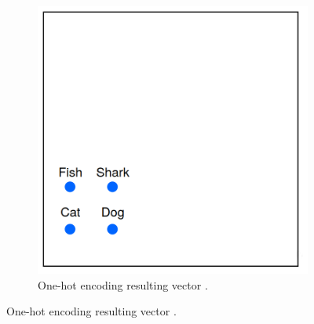         \begin{figure}[H]
            \centering
            \captionsetup{justification=centering}
          
            \begin{subfigure}{0.32\textwidth}
            \includegraphics[width=\textwidth]{Sections/3StateOfTheArt/3_images/one_hot_ex.png} 
            \caption[One-hot encoding resulting vector.]{One-hot encoding resulting vector \cite{word2vec_explained}. }
          

\end{subfigure}
\end{figure}

